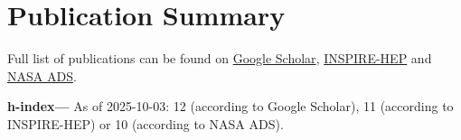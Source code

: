 \newcommand{\arxiv}[1]{[\href{http://arxiv.org/abs/#1}{arXiv:#1}]}
\def\zero{0}
\def\one{1}
\newcommand{\citeCount}[1]{%
    \def\val{#1}
    \ifx\val\zero%
    \else%
        \ifx\val\one%
        (1~citation)%
        \else%
        (#1~citations)%
        \fi%
    \fi
}


\def\apj{Astrophys.\ J.}
\def\apjs{Astrophys.\ J.\ Suppl.\ Ser.}
\def\cqg{Class.\ Quantum\ Gravity}
\def\joss{J.\ Open\ Source\ Softw.}
\def\mnras{Mon.\ Not.\ R.\ Astron.\ Soc.}
\def\prd{Phys.\ Rev.\ D}
\def\prl{Phys.\ Rev.\ Lett.}


\setcounter{numPubs}{24}
\setcounter{pubCounter}{\value{numPubs}}


\newif\ifshowpubsummary
\showpubsummarytrue
\ifshowpubsummary
\section{Publication Summary}

Full list of publications can be found on
\href{https://scholar.google.com/citations?hl=en&user=jET8KxgAAAAJ}%
{Google Scholar},
\href{https://inspirehep.net/authors/1798261}%
{INSPIRE-HEP}
and
\href{https://ui.adsabs.harvard.edu/user/libraries/SDMGXaKoRomaOJsefpo2yQ}%
{NASA ADS}.

\textbf{h-index---}%
As of 2025-10-03: 12 (according to Google Scholar),
11 (according to INSPIRE-HEP)
or 10 (according to NASA ADS).

